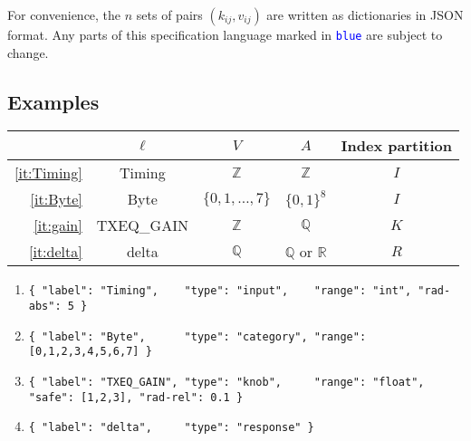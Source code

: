 \documentclass[a4paper,parskip=half]{scrartcl}
\newcommand*\spec[1]{\textcolor{blue}{\texttt{#1}}}
\begin{document}
For convenience, the $n$ sets of pairs $(k_{ij},v_{ij})$ are written as
dictionaries in JSON format.
Any parts of this specification language marked in \spec{blue} are subject to change.

\subsection{Examples}
\begin{center}
\begin{tabular}{rcccc}
	& $\ell$ & $V$ & $A$ & Index partition \\ \hline
	\ref{it:Timing} & Timing & $\mathbb Z$ & $\mathbb Z$ & $I$ \\
	\ref{it:Byte} & Byte & $\{0,1,\ldots,7\}$ & $\{0,1\}^8$ & $I$ \\
	\ref{it:gain} & TXEQ\_GAIN & $\mathbb Z$ & $\mathbb Q$ & $K$ \\
	\ref{it:delta} & delta & $\mathbb Q$ & $\mathbb Q$ or $\mathbb R$ & $R$
\end{tabular}
\end{center}
\begin{enumerate}
\item\label{it:Timing}
	{\footnotesize\verb!{ "label": "Timing",    "type": "input",    "range": "int", "rad-abs": 5 }!}
\item\label{it:Byte}
	{\footnotesize\verb!{ "label": "Byte",      "type": "category", "range": [0,1,2,3,4,5,6,7] }!}
\item\label{it:gain}
	{\footnotesize\verb!{ "label": "TXEQ_GAIN", "type": "knob",     "range": "float", "safe": [1,2,3], "rad-rel": 0.1 }!}
\item\label{it:delta}
	{\footnotesize\verb!{ "label": "delta",     "type": "response" }!}
\end{enumerate}
\end{document}
